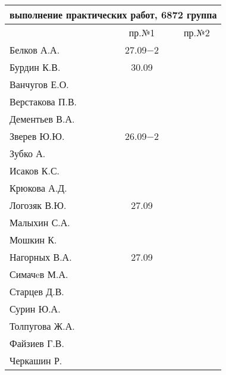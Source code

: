 \documentclass[a4paper,11pt]{article}
\begin{document}
\newpage
\begin{tabular}{l|cc}
\multicolumn{3}{c}{выполнение практических работ, 6872 группа} \\
\toprule
& пр.№1 & пр.№2 \\
\midrule
Белков А.А.    &27.09$-2$&     \\   
Бурдин К.В.    &30.09    &     \\
Ванчугов Е.О.  &         &     \\
Верстакова П.В.&         &     \\
Дементьев В.А. &         &     \\
Зверев Ю.Ю.    &26.09$-2$&     \\
Зубко А.       &         &     \\
Исаков К.С.    &         &     \\
Крюкова А.Д.   &         &     \\
Логозяк В.Ю.   &27.09    &     \\
Малыхин С.А.   &         &     \\
Мошкин К.      &         &     \\
Нагорных В.А.  &27.09    &     \\
Симачeв М.А.   &         &     \\
Старцев Д.В.   &         &     \\
Сурин Ю.А.     &         &     \\
Толпугова Ж.А. &         &     \\
Файзиев Г.В.   &         &     \\
Черкашин Р.    &         &     \\
\bottomrule
\end{tabular}
\end{document}
